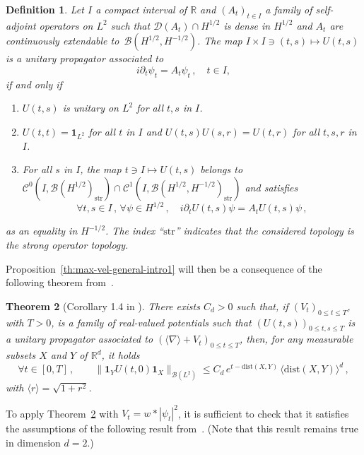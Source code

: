 \documentclass[12pt]{article}
\newcommand{\dXY}{{\mathrm{dist}(X,Y)}}
\theoremstyle{plain}
\newtheorem{theo}{Theorem}[section]
\newtheorem{definition}[theo]{Definition}
\begin{document}
\begin{definition} Let $I$ a compact interval of $\mathbb{R}$ and $(A_t)_{t\in I}$ a family of self-adjoint operators on $L^2$ such that $\mathcal{D}(A_t)\cap H^{1/2}$ is dense in $H^{1/2}$ and $A_t$ are continuously extendable to~$\mathcal{B}(H^{1/2},H^{-1/2})$. 
The map $I\times I \ni (t,s)\mapsto U(t,s)$ is a \emph{unitary propagator} associated to
\begin{equation}\label{Cauchy-pb-propagateur}
                i\partial_t \psi_t = A_t \psi_t\,, \quad t\in I,
\end{equation}
if and only if
\begin{enumerate}
    \item $U(t,s)$ is unitary on $L^2$ for all $t,s$ in $I$.
    \item $U(t,t)=\mathbf{1}_{L^2}$ for all $t$ in $I$ and $U(t,s)U(s,r)=U(t,r)$ for all $t,s,r$ in $I$.
    \item For all $s$ in $I$, the map $t\ni I \mapsto U(t,s)$ belongs to $\mathcal{C}^0(I,\mathcal{B}(H^{1/2})_{\mathrm{str}}) \cap \mathcal{C}^1(I,\mathcal{B}(H^{1/2},H^{-1/2})_{\mathrm{str}})$ and satisfies
    \[\forall t,s\in I\,,\,\forall \psi \in H^{1/2}\,, \quad i\partial_t U(t,s)\psi = A_t U(t,s)\psi\,,\]
\end{enumerate}
as an equality in $H^{-1/2}$. The index ``$\mathrm{str}$'' indicates that the considered topology  is the strong operator topology.
\end{definition}


Proposition~\ref{th:max-vel-general-intro1} will then be a consequence of the following theorem from~\cite{BFG2a}.

\begin{theo}[Corollary 1.4 in \cite{BFG2a}]\label{cor:max-vel-bounds-general-subsets}There exists $C_d>0$ such that, if   $(V_t)_{0\leq t\leq T}$, with $T>0$, is a family of real-valued potentials such that $(U(t,s))_{0\leq t,s\leq T}$ is a unitary propagator associated to $(\langle\nabla\rangle+V_t)_{0\leq t\leq T}$, then, for any measurable subsets  $X$ and $Y$ of $\mathbb{R}^{d}$, it holds
\[
\forall t\in[0,T]\,,\qquad \|\mathbf{1}_{Y}U(t,0)\mathbf{1}_{X}\|_{\mathcal{B}(L^{2})}\leq C_{d} \, e^{t-\dXY} \,  \langle\dXY\rangle^{d}\,,
\]
with $\langle r \rangle = \sqrt{1+r^2}$.
\end{theo}

To apply Theorem~\ref{cor:max-vel-bounds-general-subsets} with $V_t=w*|\psi_t|^2$, it is sufficient to check that it satisfies the assumptions of the following result from~\cite{BFG2a}. (Note that this result remains true in dimension $d=2$.)
\end{document}
